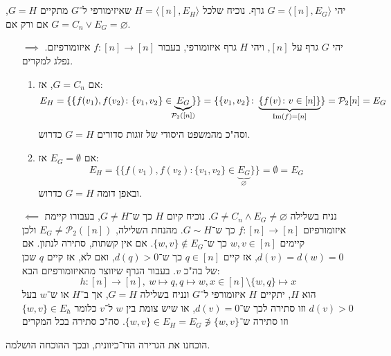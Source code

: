 \documentclass[]{article}
\newcommand\ps    {\mathcal{P}}
\newcommand\ra    {\rangle}
\newcommand\la    {\langle}
\newcommand\Img   {\mathrm{Im}}
\begin{document}
	\section{}
	יהי $G = \la [n], E_G \ra$ גרף. נוכיח שלכל $H = \la [n], E_H \ra$ שאיזימורפי ל־$G$ מתקיים $G = H$, אם ורק אם $G = C_n \lor E_G = \varnothing$. 
	\begin{itemize}
		\item[$\implies$]יהי $G$ גרף על $[n]$, ויהי $H$ גרף איזומורפי, בעבור $f \colon [n] \to [n]$ איזומורפיזם. נפלג למקרים. 
		\begin{enumerate}
			\item אם $G = C_n$, אז:
			\[ E_H = \{\{f(v_1), f(v_2) \colon \{v_1, v_2\} \in \underbrace{E_G}_{\mathclap{\ps_2([n])}}\}\} = \{\{v_1, v_2\} \colon \underbrace{\{f(v) \colon v \in [n] \}}_{\Img(f) = [n]}\} = \ps_2[n] = E_G \]
			וסה"כ מהמשפט היסודי של זוגות סדורים $G = H$ כדרוש. 
			\item אם $E_G = \emptyset$ אז: 
			\[ E_H = \{\{f(v_1), f(v_2) \colon \{v_1, v_2\} \in \underbrace{E_G}_{\varnothing}\}\} = \emptyset = E_G \]
			ובאפן דומה $G = H$ כדרוש. 
		\end{enumerate}
		\item[$\impliedby$]נניח בשלילה $G \neq C_n \land E_G \neq \varnothing$. נוכיח קיום $H$ כך ש־$G \neq H$, בעבורו קיימת איזומורפיזם $f \colon [n] \to [n]$ כך ש־$G \sim H$. מהנחת השלילה, $E_G \neq \ps_2([n])$ ולכן קיימים $w, v \in [n]$ כך ש־$\{w, v\} \notin E_G$. אם אין קשתות, סתירה לנתון. אם $d(v) = d(w) = 0$, אז קיים $q \in [n]$ כך ש־$d(q) > 0$, ואם לא, אז קיים $q$ שכן של בה"כ $v$. בעבור הגרף שיווצר מהאיזומורפיזם הבא: 
		\[ h \colon [n] \to [n], \ w \mapsto q, q \mapsto w, x \in [n] \setminus \{w, q\} \mapsto x \]
		הוא $H$, יתקיים $H$ איזומורפי ל־$G$ ונניח בשלילה $G = H$, אך ב־$H$ או ש־$w$ בעל $d(v) > 0$ וזו סתירה לכך ש־$d(v) = 0$, או שיש צומת בין  $w$ ל־$v$ כלומר $\{w, v\} \in E_h$ וזו סתירה ש־$\{w, v\}\in E_H = E_G \not\ni \{w, v\}$. סה"כ סתירה בכל המקרים
	\end{itemize}
	הוכחנו את הגרירה הדו־כיוונית, ובכך ההוכחה הושלמה. 
\end{document}
